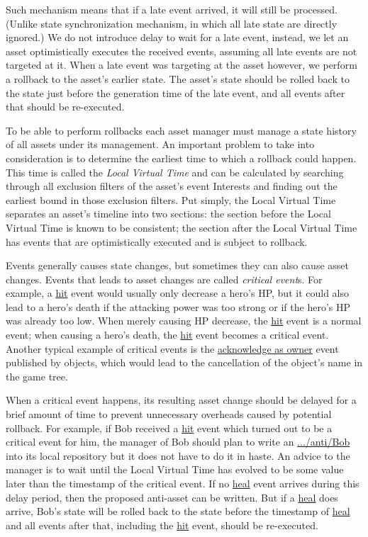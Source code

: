 Such mechanism means that if a late event arrived, it will still be processed. (Unlike state synchronization mechanism, in which all late state are directly ignored.) We do not introduce delay to wait for a late event, instead, we let an asset optimistically executes the received events, assuming all late events are not targeted at it. When a late event was targeting at the asset however, we perform a rollback to the asset's earlier state. The asset's state should be rolled back to the state just before the generation time of the late event, and all events after that should be re-executed. 

To be able to perform rollbacks each asset manager must manage a state history of all assets under its management. An important problem to take into consideration is to determine the earliest time to which a rollback could happen. This time is called the \emph{Local Virtual Time} and can be calculated by searching through all exclusion filters of the asset's event Interests and finding out the earliest bound in those exclusion filters. Put simply, the Local Virtual Time separates an asset's timeline into two sections: the section before the Local Virtual Time is known to be consistent; the section after the Local Virtual Time has events that are optimistically executed and is subject to rollback.

Events generally causes state changes, but sometimes they can also cause asset changes. Events that leads to asset changes are called \emph{critical event}s. For example, a \url{hit} event would usually only decrease a hero's HP, but it could also lead to a hero's death if the attacking power was too strong or if the hero's HP was already too low. When merely causing HP decrease, the \url{hit} event is a normal event; when causing a hero's death, the \url{hit} event becomes a critical event. Another typical example of critical events is the \url{acknowledge as owner} event published by objects, which would lead to the cancellation of the object's name in the game tree. 

When a critical event happens, its resulting asset change should be delayed for a brief amount of time to prevent unnecessary overheads caused by potential rollback. For example, if Bob received a \url{hit} event which turned out to be a critical event for him, the manager of Bob should plan to write an \url{.../anti/Bob} into its local repository but it does not have to do it in haste. An advice to the manager is to wait until the Local Virtual Time has evolved to be some value later than the timestamp of the critical event. If no \url{heal} event arrives during this delay period, then the proposed anti-asset can be written. But if a \url{heal} does arrive, Bob's state will be rolled back to the state before the timestamp of \url{heal} and all events after that, including the \url{hit} event, should be re-executed.

